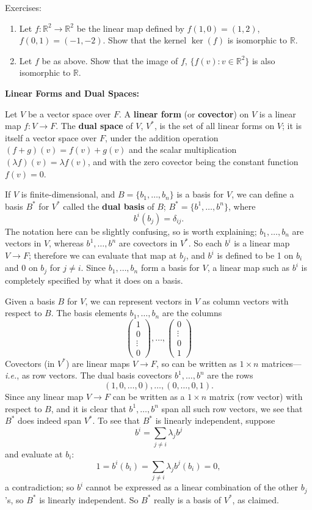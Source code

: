 \documentclass{article}
\begin{document}
Exercises:

\begin{enumerate}
	\item Let $f:\mathbb{R}^2\to \mathbb{R}^2$ be the linear map defined by $f(1,0)=(1,2)$, $f(0,1)=(-1,-2)$. Show that the kernel $\ker(f)$ is isomorphic to $\mathbb{R}$.
	\item Let $f$ be as above. Show that the image of $f$, $\{f(v):v\in\mathbb{R}^2\}$ is also isomorphic to $\mathbb{R}$.
\end{enumerate}



\textbf{Linear Forms and Dual Spaces:}\bigskip


Let $V$ be a vector space over $F$. A \textbf{linear form} (or \textbf{covector}) on $V$ is a linear map $f:V\to F$. The \textbf{dual space} of $V$, $V^*$, is the set of all linear forms on $V$; it is itself a vector space over $F$, under the addition operation $(f+g)(v)=f(v)+g(v)$ and the scalar multiplication $(\lambda f)(v)=\lambda f(v)$, and with the zero covector being the constant function $f(v)=0$.

If $V$ is finite-dimensional, and $B=\{b_1,\hdots,b_n\}$ is a basis for $V$, we can define a basis $B^*$ for $V^*$ called the \textbf{dual basis} of $B$; $B^*=\{b^1,\hdots,b^n\}$, where
\[b^i(b_j)=\delta_{ij}.\]
The notation here can be slightly confusing, so is worth explaining; $b_1,\hdots,b_n$ are vectors in $V$, whereas $b^1,\hdots,b^n$ are covectors in $V^*$. So each $b^i$ is a linear map $V\to F$; therefore we can evaluate that map at $b_j$, and $b^i$ is defined to be 1 on $b_i$ and $0$ on $b_j$ for $j\neq i$. Since $b_1,\hdots,b_n$ form a basis for $V$, a linear map such as $b^i$ is completely specified by what it does on a basis.

Given a basis $B$ for $V$, we can represent vectors in $V$ as column vectors with respect to $B$. The basis elements $b_1,\hdots,b_n$ are the columns
\[\left(\begin{array}{c}1\\0\\ \vdots \\ 0\end{array}\right),\hdots,\left(\begin{array}{c}0\\ \vdots\\ 0 \\1\end{array}\right)\]
Covectors (in $V^*$) are linear maps $V\to F$, so can be written as $1\times n$ matrices---\textit{i.e.}, as row vectors. The dual basis covectors $b^1,\hdots,b^n$ are the rows
\[(1,0,\hdots,0),\hdots,(0,\hdots,0,1).\]
Since any linear map $V\to F$ can be written as a $1\times n$ matrix (row vector) with respect to $B$, and it is clear that $b^1,\hdots,b^n$ span all such row vectors, we see that $B^*$ does indeed span $V^*$. To see that $B^*$ is linearly independent, suppose
\[b^i=\sum_{j\neq i} \lambda_j b^j\]
and evaluate at $b_i$:
\[1=b^i(b_i)=\sum_{j\neq i}\lambda_j b^j(b_i)=0,\]
a contradiction; so $b^i$ cannot be expressed as a linear combination of the other $b_j$'s, so $B^*$ is linearly independent. So $B^*$ really is a basis of $V^*$, as claimed.
\end{document}

